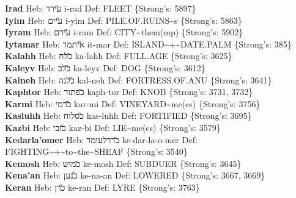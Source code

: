 {\textbf{Irad} Heb: {\large\H עירד} i-rad Def: FLEET \{Strong's: 5897\}\hfill{}\\

\textbf{Iyim} Heb: {\large\H עיים} i-yim Def: PILE.OF.RUINS\textasciitilde{}s \{Strong's: 5863\}\hfill{}\\

\textbf{Iyram} Heb: {\large\H עירם} i-ram Def: CITY\textasciitilde{}them(mp) \{Strong's: 5902\}\hfill{}\\

\textbf{Iytamar} Heb: {\large\H איתמר} it-mar Def: ISLAND\textasciitilde{}+\textasciitilde{}DATE.PALM \{Strong's: 385\}\hfill{}\\

\textbf{Kalahh} Heb: {\large\H כלח} ka-lahh Def: FULL.AGE \{Strong's: 3625\}\hfill{}\\

\textbf{Kaleyv} Heb: {\large\H כלב} ka-leyv Def: DOG \{Strong's: 3612\}\hfill{}\\

\textbf{Kalneh} Heb: {\large\H כלנה} kal-neh Def: FORTRESS.OF.ANU \{Strong's: 3641\}\hfill{}\\

\textbf{Kaphtor} Heb: {\large\H כפתור} kaph-tor Def: KNOB \{Strong's: 3731, 3732\}\hfill{}\\

\textbf{Karmi} Heb: {\large\H כרמי} kar-mi Def: VINEYARD\textasciitilde{}me(cs) \{Strong's: 3756\}\hfill{}\\

\textbf{Kasluhh} Heb: {\large\H כסלוח} kas-luhh Def: FORTIFIED \{Strong's: 3695\}\hfill{}\\

\textbf{Kazbi} Heb: {\large\H כזבי} kaz-bi Def: LIE\textasciitilde{}me(cs) \{Strong's: 3579\}\hfill{}\\

\textbf{Kedarla'omer} Heb: {\large\H כדרלעומר} ke-dar-la-o-mer Def: FIGHTING\textasciitilde{}+\textasciitilde{}to\textasciitilde{}the\textasciitilde{}SHEAF \{Strong's: 3540\}\hfill{}\\

\textbf{Kemosh} Heb: {\large\H כמוש} ke-mosh Def: SUBDUER \{Strong's: 3645\}\hfill{}\\

\textbf{Kena'an} Heb: {\large\H כנען} ke-na-an Def: LOWERED \{Strong's: 3667, 3669\}\hfill{}\\

\textbf{Keran} Heb: {\large\H כרן} ke-ran Def: LYRE \{Strong's: 3763\}\hfill{}\\

}
